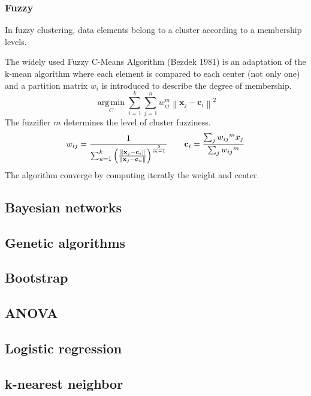\documentclass[twocolumn]{article}
\numberwithin{equation}{section}
\begin{document}
		\subsubsection*{Fuzzy}
In fuzzy clustering, data elements belong to a cluster according to a membership levels.

The widely used Fuzzy C-Means Algorithm (Bezdek 1981) is an adaptation of the k-mean algorithm where each element is compared to each center (not only one) and a partition matrix $w_i$ is introduced to describe the degree of membership.
 $$\underset{C} {\operatorname{arg\,min}}  \sum_{i=1}^{k} \sum_{j=1}^{n} w_{ij}^m \left\|\mathbf{x}_j - \mathbf{c}_i \right\|^2$$
 The fuzzifier $m$ determines the level of cluster fuzziness.
$$w_{ij} = \frac{1}{\sum_{u=1}^{k} \left(\frac{\left\|\mathbf{x}_j - \mathbf{c}_i \right\|}{\left\|\mathbf{x}_j - \mathbf{c}_u \right\|}\right)^{\frac{2}{m-1}}} \qquad \mathbf{c}_i = {{\sum_j {w_{ij}} ^ {m} x_j} \over {\sum_j {w_{ij}} ^ {m}}}$$
The algorithm converge by computing iteratly the weight and center.
	\subsection{Bayesian networks}
	\subsection{Genetic algorithms}
	\subsection{Bootstrap}
	\subsection{ANOVA}
	\subsection{Logistic regression}
	\subsection{k-nearest neighbor}




	
	
\end{document}
